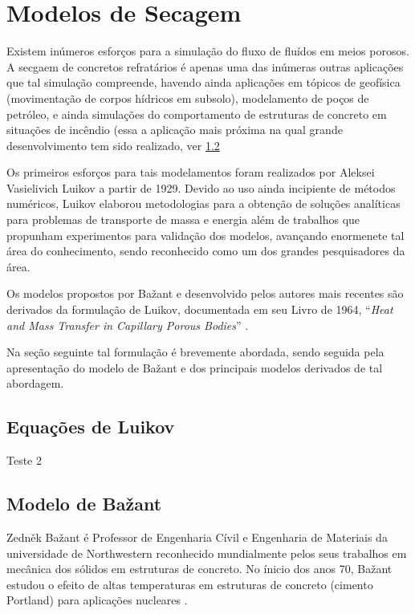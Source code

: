 \section{Modelos de Secagem}\label{modelos}
Existem inúmeros esforços para a simulação do fluxo de fluídos em meios porosos.
A secgaem de concretos refratários é apenas uma das inúmeras outras aplicações
que tal simulação compreende, havendo ainda aplicações em tópicos de geofísica
(movimentação de corpos hídricos em subsolo), modelamento de poços de petróleo,
e ainda simulações do comportamento de estruturas de concreto em situações de
incêndio (essa a aplicação mais próxima na qual grande desenvolvimento tem sido
realizado, ver \ref{sec:bazant}


Os primeiros esforços para tais modelamentos foram realizados por Aleksei Vasielivich Luikov
\cite{martynenko2010} a partir de 1929. Devido ao uso ainda incipiente de
métodos numéricos, Luikov elaborou metodologias para a obtenção de soluções
analíticas para problemas de transporte de massa e energia além de trabalhos que
propunham experimentos para validação dos modelos, avançando enormenete tal área
do conhecimento, sendo reconhecido como um dos grandes pesquisadores da área.

Os modelos propostos por Ba\v{z}ant e desenvolvido pelos autores mais recentes são
derivados da formulação de Luikov, documentada em seu Livro de 1964, ``\textit{Heat and
Mass Transfer in Capillary Porous Bodies}''
\cite{luikov1964heat}.

Na seção seguinte tal formulação é brevemente abordada, sendo seguida pela
apresentação do modelo de Ba\v{z}ant e dos principais modelos derivados de tal abordagem.



    \subsection{Equações de Luikov}
    Teste 2 

    
    \subsection{Modelo de Ba\v{z}ant}\label{sec:bazant}
    Zedn\v{e}k Ba\v{z}ant é Professor de Engenharia Cívil e Engenharia de
    Materiais da universidade de Northwestern reconhecido mundialmente pelos
    seus trabalhos em  mecânica dos sólidos em estruturas de concreto. No ínicio
    dos anos 70, Ba\v{z}ant estudou o efeito de altas temperaturas em estruturas
    de concreto (cimento Portland) para aplicações nucleares \cite{bundesen2004biography}.
    
